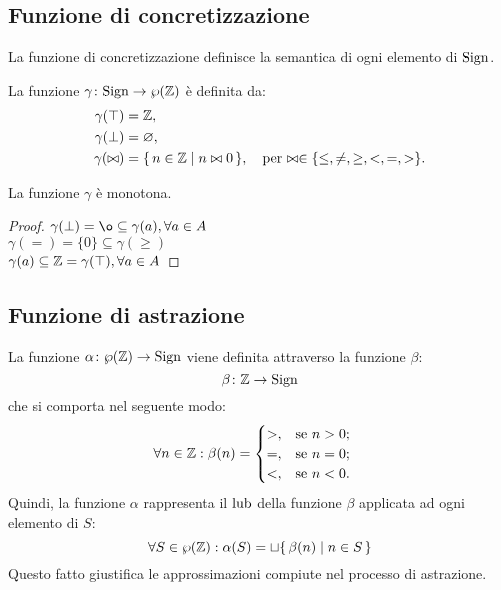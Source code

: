 \subsection{Funzione di concretizzazione}

La funzione di concretizzazione definisce la semantica di ogni
elemento di $\mathrm{Sign}$.
\begin{definizione} 
La funzione $\mathord{\gamma}\colon\mathrm{Sign}\to\wp(\mathbb{Z})$ è definita
da:
\begin{align*}
  \gamma(\top) &= \mathbb{Z}, \\
  \gamma(\bot) &= \varnothing, \\
  \gamma(\bowtie) &= \{\, n \in \mathbb{Z} \mid n \bowtie 0 \,\},
    \quad\text{per $\bowtie \in \{ \leq, \neq, \geq, <, =, > \}$.}
\end{align*}
\end{definizione}

\begin{proposizione}
La funzione $\gamma$ è monotona.
\end{proposizione}
\begin{proof}
	$ \gamma(\bot) = \o \subseteq \gamma(a) , \forall a \in A $ \\
	$ \gamma(=) = \{0\} \subseteq \gamma(\geq) $ \\
	$ \gamma(a) \subseteq \mathbb{Z} = \gamma(\top), \forall a \in A $
\end{proof}

\subsection{Funzione di astrazione}

\begin{definizione} 
La funzione $\mathord{\alpha}\colon\wp(\mathbb{Z})\to\mathrm{Sign}$ viene definita attraverso
la funzione $\beta$:
\[
	\mathord{\beta}\colon\mathbb{Z}\to\mathrm{Sign}
\]
che si comporta nel seguente modo:
\begin{align*}
	\forall n \in \mathbb{Z}: \beta(n) &=
	\begin{cases}
		>,	&\text{se $n  >  0$;} \\
		=,	&\text{se $n = 0$;} \\
		<,	&\text{se $n < 0$.}
	\end{cases} 
\end{align*}
Quindi, la funzione $\alpha$ rappresenta il $\mathop{\mathrm{lub}}\nolimits$ della
funzione $\beta$ applicata ad ogni elemento di $S$:
\[
	\forall S \in \wp(\mathbb{Z}) : \alpha(S) = \sqcup \{\, \beta(n) \mid n \in S \,\}
\]
Questo fatto giustifica le approssimazioni compiute nel processo
di astrazione.
\end{definizione}

